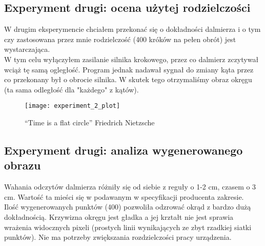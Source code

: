 \newpage
\subsection {Experyment drugi: ocena użytej rodzielczości}

W drugim eksperymencie chciałem przekonać się o dokładności dalmierza i o tym czy zastosowana przez mnie rodzielczość (400 króków na pełen obrót) jest wystarczająca.\\

W tym celu wyłączyłem zasilanie silnika krokowego, przez co dalmierz zczytywał wciąż tę samą ogległość. Program jednak nadawał sygnał do zmiany kąta przez co przekonany był o obrocie silnika. W skutek tego otrzymaliśmy obraz okręgu (ta sama odległość dla "każdego" z kątów).

\begin{figure}[h]
    \centering
    \texttt{[image: experiment\_2\_plot]}
    \caption{“Time is a flat circle” Friedrich Nietzsche}
    \label{fig:experiment_2_plot}
\end{figure}

\subsection {Experyment drugi: analiza wygenerowanego obrazu}

Wahania odczytów dalmierza różniły się od siebie z reguły o 1-2 cm, czasem o 3 cm. Wartość ta mieści się w podawanym w specyfikacji producenta zakresie.\\

Ilość wygenerowanych punktów (400) pozwoliła odzrować okrąd z bardzo dużą dokładnością. Krzywizna okręgu jest gładka a jej krztałt nie jest sprawia wrażenia widocznych pixeli (prostych linii wynikających ze zbyt rzadkiej siatki punktów). Nie ma potrzeby zwiększania rozdzielczości pracy urządzenia.\\
